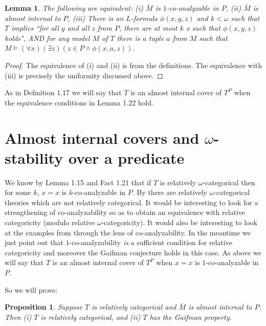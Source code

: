 \documentclass[12pt]{article}
\newtheorem{Proposition}[Theorem]{Proposition}
\newtheorem{Lemma}[Theorem]{Lemma}
\begin{document}
\begin{Lemma} The following are equivalent:
\newline
(i) ${\bar M}$ is $1$-co-analyzable in $P$,
\newline
(ii) ${\bar M}$ is almost internal to $P$,
\newline
(iii)  There is an $L$-formula $\phi(x,y,z)$ and $k<\omega$ such that $T$ implies ``for all $y$ and all $z$ from $P$, there are at most $k$ x such that $\phi(x,y,z)$ holds", AND for any model $M$ of $T$ there is a tuple $a$ from $M$ such that  $M\models (\forall x)(\exists z)(z\in P \wedge \phi(x,a,z))$.

\end{Lemma}
\begin{proof} The equivalence of (i) and (ii) is from the definitions.  The equivalence with (iii) is precisely the uniformity discussed above.
\end{proof}

As in Definition 1.17 we will say that $T$ is an almost internal cover of $T^{P}$  when the equivalence conditions in Lemma 1.22 hold. 




\section{Almost internal covers and $\omega$-stability over a predicate}
We know by Lemma 1.15  and Fact 1.21 that if $T$ is relatively $\omega$-categorical then for some $k$, $x=x$ is $k$-co-analyzable in $P$.   By \cite{Hart-Shelah} there are relatively $\omega$-categorical theories which are not relatively  categorical. It would be interesting to look for  a strengthening of co-analyzability so as to obtain an equivalence with relative categoricity (modulo relative $\omega$-categoricity).  It would also be interesting to look at the examples from \cite{Hart-Shelah} through the lens of co-analyzability.  In the meantime we just point out that $1$-co-analyzability {\em is} a sufficient condition for relative categoricity and moreover the Gaifman conjecture holds in this case.  
As above we will say that $T$ is an almost internal cover of $T^{P}$ when $x=x$ is $1$-co-analyzable in $P$. 

So we will prove:
\begin{Proposition} Suppose $T$ is relatively categorical and ${\bar M}$ is almost internal to $P$. Then 
\newline
(i) $T$ is relatively categorical, and
\newline
(ii) $T$ has the Gaifman property.
\end{Proposition} 
\end{document}
